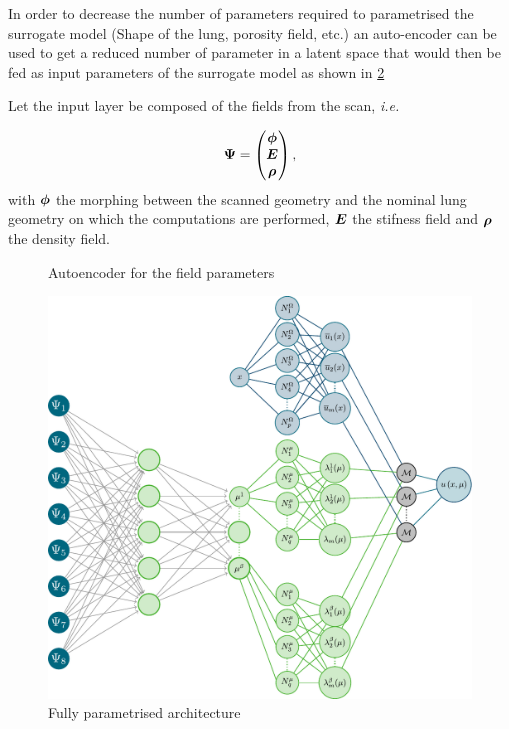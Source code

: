 In order to decrease the number of parameters required to parametrised the surrogate model (Shape of the lung, porosity field, etc.) an auto-encoder can be used to get a reduced number of parameter in a latent space that would then be fed as input parameters of the surrogate model as shown in \cref{fig:autoencoderHiDeNNPGD}

Let the input layer be composed of the fields from the scan, \emph{i.e.}

\begin{equation}
	\boldsymbol{\Psi} = \begin{pmatrix}
		\boldsymbol{\phi} \\  
		\boldsymbol{E}\\  
		\boldsymbol{\rho}    
	\end{pmatrix}, 
\end{equation}
with $\boldsymbol{\phi} $ the morphing between the scanned geometry and the nominal lung geometry on which the computations are performed, $\boldsymbol{E}$ the stifness field and $\boldsymbol{\rho}$ the density field. 


\begin{figure}
\centering
	
	\caption{Autoencoder for the field parameters}
	\label{fig:autoencoder}
\end{figure}


\begin{figure}[H]
	\centering
	\includegraphics[width = 0.8\linewidth]{Schema/AutoencoderHiDeNNPGD.pdf}
	\caption{Fully parametrised architecture}
	\label{fig:autoencoderHiDeNNPGD}
\end{figure}







